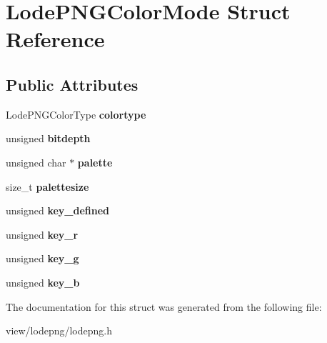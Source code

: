 \hypertarget{struct_lode_p_n_g_color_mode}{\section{Lode\-P\-N\-G\-Color\-Mode Struct Reference}
\label{struct_lode_p_n_g_color_mode}
}
\subsection*{Public Attributes}
\begin{DoxyCompactItemize}
\item 
\hypertarget{struct_lode_p_n_g_color_mode_a4f3df7240411abe80546052d197fbe8d}{Lode\-P\-N\-G\-Color\-Type {\bfseries colortype}}\label{struct_lode_p_n_g_color_mode_a4f3df7240411abe80546052d197fbe8d}

\item 
\hypertarget{struct_lode_p_n_g_color_mode_ad20010b9561980f65281bc17f7848253}{unsigned {\bfseries bitdepth}}\label{struct_lode_p_n_g_color_mode_ad20010b9561980f65281bc17f7848253}

\item 
\hypertarget{struct_lode_p_n_g_color_mode_a54f0a793238009fcb95f081626fae308}{unsigned char $\ast$ {\bfseries palette}}\label{struct_lode_p_n_g_color_mode_a54f0a793238009fcb95f081626fae308}

\item 
\hypertarget{struct_lode_p_n_g_color_mode_a407557f056168682d9319aeb60866dcc}{size\-\_\-t {\bfseries palettesize}}\label{struct_lode_p_n_g_color_mode_a407557f056168682d9319aeb60866dcc}

\item 
\hypertarget{struct_lode_p_n_g_color_mode_ab9105505c5d56cfc6ce4efe1bb288b54}{unsigned {\bfseries key\-\_\-defined}}\label{struct_lode_p_n_g_color_mode_ab9105505c5d56cfc6ce4efe1bb288b54}

\item 
\hypertarget{struct_lode_p_n_g_color_mode_a29e64327bca1f3d16235e9ff471e4d50}{unsigned {\bfseries key\-\_\-r}}\label{struct_lode_p_n_g_color_mode_a29e64327bca1f3d16235e9ff471e4d50}

\item 
\hypertarget{struct_lode_p_n_g_color_mode_ad98309f36d289392b0c440baa50af9f6}{unsigned {\bfseries key\-\_\-g}}\label{struct_lode_p_n_g_color_mode_ad98309f36d289392b0c440baa50af9f6}

\item 
\hypertarget{struct_lode_p_n_g_color_mode_a93a269405fee0d1c5045a1a671ed1de8}{unsigned {\bfseries key\-\_\-b}}\label{struct_lode_p_n_g_color_mode_a93a269405fee0d1c5045a1a671ed1de8}

\end{DoxyCompactItemize}


The documentation for this struct was generated from the following file\-:\begin{DoxyCompactItemize}
\item 
view/lodepng/lodepng.\-h\end{DoxyCompactItemize}
